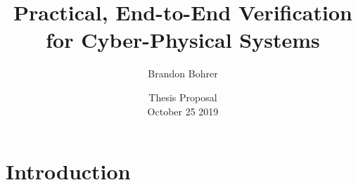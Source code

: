 \documentclass[slidestop,aspectratio=169]{beamer}
\title{Practical, End-to-End Verification for Cyber-Physical Systems}
\author{Brandon Bohrer}
\institute[Thesis Committee] %
{
  Andr\'{e} Platzer\\
  Stefan Mitsch\\
  Frank Pfenning\\
  Bradley Schmerl, ISR\\
  Tobias Nipkow, TU Munich
}
\date{Thesis Proposal\\October 25 2019}
\theoremstyle{plain}
\theoremstyle{definition}
\theoremstyle{remark}
\begin{document}
\begin{frame}
  \titlepage
\end{frame}

\section{Introduction}
\end{document}
